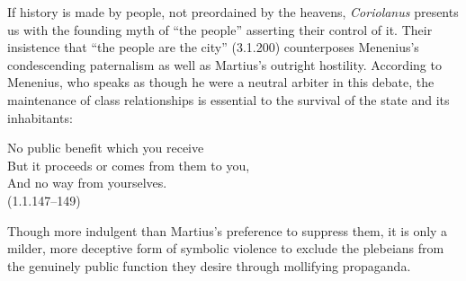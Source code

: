 If history is made by people, not preordained by the heavens, \emph{Coriolanus} presents us with the founding myth of ``the people'' asserting their control of it.
Their insistence that ``the people are the city'' (3.1.200) counterposes Menenius's condescending paternalism as well as Martius's outright hostility.
According to Menenius, who speaks as though he were a neutral arbiter in this debate, the maintenance of class relationships is essential to the survival of the state and its inhabitants:
\begin{vq}
No public benefit which you receive\\
But it proceeds or comes from them to you,\\
And no way from yourselves.\\
\hfill(1.1.147--149)
\end{vq}
Though more indulgent than Martius's preference to suppress them, it is only a milder, more deceptive form of symbolic violence to exclude the plebeians from the genuinely public function they desire through mollifying propaganda.

